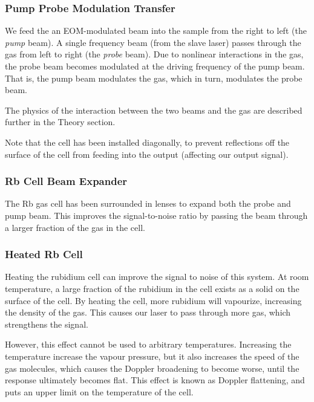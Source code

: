     \subsubsection{Pump Probe Modulation Transfer}
    
We feed the an EOM-modulated beam into the sample from the right to left (the \emph{pump} beam).  A single frequency beam (from the slave laser) passes through the gas from left to right (the \emph{probe} beam).  Due to nonlinear interactions in the gas, the probe beam becomes modulated at the driving frequency of the pump beam.  That is, the pump beam modulates the gas, which in turn, modulates the probe beam.

The physics of the interaction between the two beams and the gas are described further in the Theory section.

Note that the cell has been installed diagonally, to prevent reflections off the surface of the cell from feeding into the output (affecting our output signal).

    \subsubsection{Rb Cell Beam Expander}
    
The Rb gas cell has been surrounded in lenses to expand both the probe and pump beam.  This improves the signal-to-noise ratio by passing the beam through a larger fraction of the gas in the cell.

    \subsubsection{Heated Rb Cell}
    
Heating the rubidium cell can improve the signal to noise of this system.  At room temperature, a large fraction of the rubidium in the cell exists as a solid on the surface of the cell.  By heating the cell, more rubidium will vapourize, increasing the density of the gas.  This causes our laser to pass through more gas, which strengthens the signal.

However, this effect cannot be used to arbitrary temperatures.  Increasing the temperature increase the vapour pressure, but it also increases the speed of the gas molecules, which causes the Doppler broadening to become worse, until the response ultimately becomes flat.  This effect is known as Doppler flattening, and puts an upper limit on the temperature of the cell.

